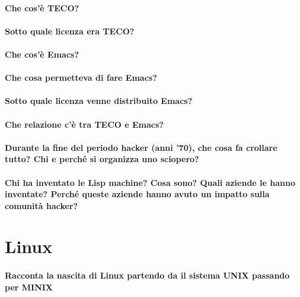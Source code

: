 \documentclass[a4paper]{article}
\begin{document}
		\paragraph{Che cos'è TECO?}
	
		\paragraph{Sotto quale licenza era TECO?}
	
		\paragraph{Che cos'è Emacs?} %
	
		\paragraph{Che cosa permetteva di fare Emacs?}
	
		\paragraph{Sotto quale licenza venne distribuito Emacs?}

		\paragraph{Che relazione c'è tra TECO e Emacs?}
		
		
		\paragraph{Durante la fine del periodo hacker (anni '70), che cosa fa crollare tutto? Chi e perché si organizza uno sciopero?}
		
		
		\paragraph{Chi ha inventato le Lisp machine? Cosa sono? Quali aziende le hanno inventate? Perché queste aziende hanno avuto un impatto sulla comunità hacker?}
	
	

	\section{Linux}
		
		\paragraph{Racconta la nascita di Linux partendo da il sistema UNIX passando per MINIX}
		
\end{document}
